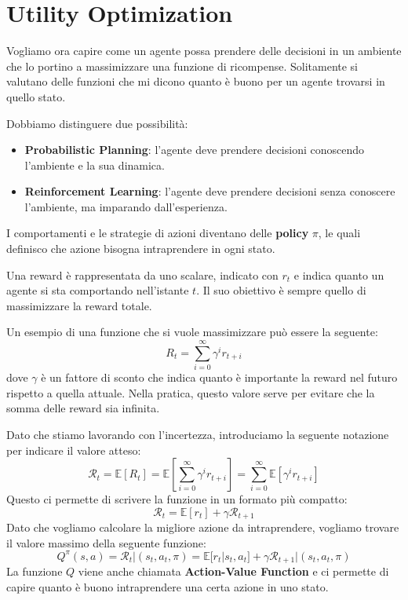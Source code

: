 \section{Utility Optimization}
Vogliamo ora capire come un agente possa prendere delle decisioni in un ambiente
che lo portino a massimizzare una funzione di ricompense. Solitamente si valutano
delle funzioni che mi dicono quanto è buono per un agente trovarsi in quello stato.

Dobbiamo distinguere due possibilità:
\begin{itemize}
    \item \textbf{Probabilistic Planning}: l'agente deve prendere decisioni
          conoscendo l'ambiente e la sua dinamica.
    \item \textbf{Reinforcement Learning}: l'agente deve prendere decisioni senza
          conoscere l'ambiente, ma imparando dall'esperienza.
\end{itemize}
I comportamenti e le strategie di azioni diventano delle \textbf{policy} $\pi$,
le quali definisco che azione bisogna intraprendere in ogni stato.

Una reward è rappresentata da uno scalare, indicato con $r_t$ e indica quanto
un agente si sta comportando nell'istante $t$. Il suo obiettivo è sempre quello
di massimizzare la reward totale.

Un esempio di una funzione che si vuole massimizzare può essere la seguente:
\begin{equation}
    R_t = \sum_{i=0}^{\infty} \gamma^i r_{t + i}
\end{equation}
dove $\gamma$ è un fattore di sconto che indica quanto è importante la reward
nel futuro rispetto a quella attuale. Nella pratica, questo valore serve per
evitare che la somma delle reward sia infinita.

Dato che stiamo lavorando con l'incertezza, introduciamo la seguente notazione
per indicare il valore atteso:
\begin{equation}
    \mathcal{R}_t = \mathbb{E}[R_t] = \mathbb{E}\left[\sum_{i=0}^{\infty}
        \gamma^i r_{t + i}\right] = \sum_{i = 0}^{\infty} \mathbb{E}[\gamma^i r_{t + i}]
\end{equation}
Questo ci permette di scrivere la funzione in un formato più compatto:
\begin{equation}
    \mathcal{R}_t = \mathbb{E}[r_t] + \gamma \mathcal{R}_{t + 1}
\end{equation}
Dato che vogliamo calcolare la migliore azione da intraprendere, vogliamo trovare
il valore massimo della seguente funzione:
\begin{equation}
    Q^{\pi}(s, a) = \mathcal{R}_t |(s_t, a_t, \pi) = \mathbb{E}[r_t | s_t, a_t]
    + \gamma \mathcal{R}_{t + 1} | (s_t, a_t, \pi)
\end{equation}
La funzione $Q$ viene anche chiamata \textbf{Action-Value Function} e ci permette
di capire quanto è buono intraprendere una certa azione in uno stato.

